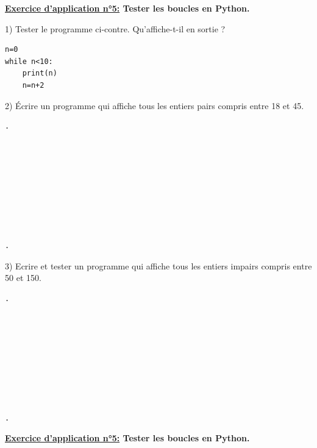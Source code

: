\documentclass[12pt]{article}
\begin{document}
\begin{mdframed}[
    linewidth=1pt,
    roundcorner=5pt,
    linecolor=RoyalBlue,
    innertopmargin=10pt,
    innerbottommargin=10pt
]
{\color{RoyalBlue}
\textbf{\underline{Exercice d'application n°5:} Tester les boucles en Python.}}

\vspace{5pt}
\begin{minipage}[t]{.45\textwidth}%
    \vspace{0pt}
    1) Tester le programme ci-contre. Qu’affiche-t-il en sortie ?

    \vspace{0.5cm}
    {\color{black!45}\dotfill}
    
\end{minipage}%
\hfill
\begin{minipage}[t]{.5\textwidth}%
    \vspace{0pt}
\begin{lstlisting}
n=0
while n<10:
    print(n)
    n=n+2
\end{lstlisting}
\end{minipage}%

\vspace{0.5cm}
{\color{black!45}\dotfill}

\vspace{0.5cm}
{\color{black!45}\dotfill}

\vspace{20pt}

2) Écrire un programme qui affiche tous les entiers pairs
compris entre 18 et 45.

\begin{lstlisting}
.









.
\end{lstlisting}

\vspace{5pt}
3) Ecrire et tester un programme qui affiche tous les entiers
impairs
compris entre 50 et 150.

\begin{lstlisting}
.









.
\end{lstlisting}

\newpage
{\color{RoyalBlue}
\textbf{\underline{Exercice d'application n°5:} Tester les boucles en Python.}}


\end{mdframed}
\end{document}
